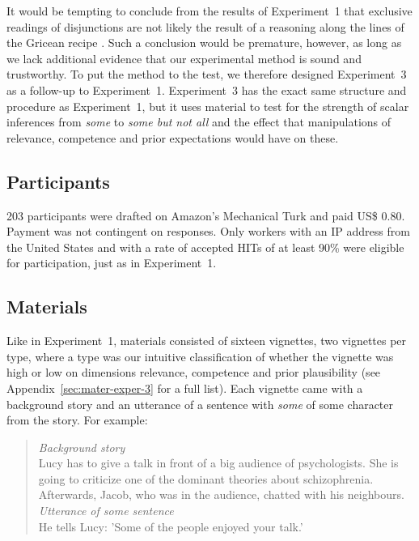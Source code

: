 \documentclass[12pt]{article}
\begin{document}
It would be tempting to conclude from the results of Experiment~1 that exclusive readings of
disjunctions are not likely the result of a reasoning along the lines of the Gricean recipe
. Such a conclusion would be premature, however, as long
as we lack additional evidence that our experimental method is sound and trustworthy. To put
the method to the test, we therefore designed Experiment~3 as a follow-up to
Experiment~1. Experiment~3 has the exact same structure and procedure as Experiment~1, but it
uses material to test for the strength of scalar inferences from \emph{some} to \emph{some but
  not all} and the effect that manipulations of relevance, competence and prior expectations
would have on these.

\subsection*{Participants}

203 participants were drafted on Amazon's Mechanical Turk and paid US\$ 0.80. Payment was not
contingent on responses. Only workers with an IP address from the United States and with a rate
of accepted HITs of at least 90\% were eligible for participation, just as in Experiment~1.

\subsection*{Materials}

Like in Experiment~1, materials consisted of sixteen vignettes, two vignettes per type, where a
type was our intuitive classification of whether the vignette was high or low on dimensions
relevance, competence and prior plausibility (see Appendix~\ref{sec:mater-exper-3} for a full
list). Each vignette came with a background story and an utterance of a sentence with
\emph{some} of some character from the story. For example:

\begin{quote}
  \emph{Background story} \\
  Lucy has to give a talk in front of a big audience of psychologists. She is going to
  criticize one of the dominant theories about schizophrenia. Afterwards, Jacob, who was in the
  audience, chatted with his neighbours.\\[.2cm] 
  \emph{Utterance of \emph{some} sentence}\\
  He tells Lucy: 'Some of the people enjoyed your talk.'
\end{quote}
\end{document}
